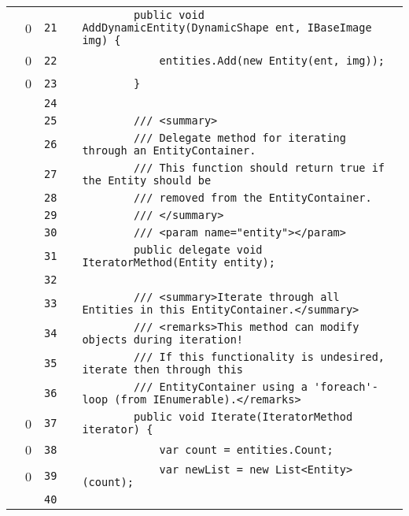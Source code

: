 \documentclass[a4paper,landscape,10pt]{article}
\begin{document}
\begin{longtable}[l]{lrrll}
\cellcolor{red} & 0 & \verb~21~ & & \verb~        public void AddDynamicEntity(DynamicShape ent, IBaseImage img) {~\\
\cellcolor{red} & 0 & \verb~22~ & & \verb~            entities.Add(new Entity(ent, img));~\\
\cellcolor{red} & 0 & \verb~23~ & & \verb~        }~\\
\cellcolor{gray} &  & \verb~24~ & & \verb~~\\
\cellcolor{gray} &  & \verb~25~ & & \verb~        /// <summary>~\\
\cellcolor{gray} &  & \verb~26~ & & \verb~        /// Delegate method for iterating through an EntityContainer.~\\
\cellcolor{gray} &  & \verb~27~ & & \verb~        /// This function should return true if the Entity should be~\\
\cellcolor{gray} &  & \verb~28~ & & \verb~        /// removed from the EntityContainer.~\\
\cellcolor{gray} &  & \verb~29~ & & \verb~        /// </summary>~\\
\cellcolor{gray} &  & \verb~30~ & & \verb~        /// <param name="entity"></param>~\\
\cellcolor{gray} &  & \verb~31~ & & \verb~        public delegate void IteratorMethod(Entity entity);~\\
\cellcolor{gray} &  & \verb~32~ & & \verb~~\\
\cellcolor{gray} &  & \verb~33~ & & \verb~        /// <summary>Iterate through all Entities in this EntityContainer.</summary>~\\
\cellcolor{gray} &  & \verb~34~ & & \verb~        /// <remarks>This method can modify objects during iteration!~\\
\cellcolor{gray} &  & \verb~35~ & & \verb~        /// If this functionality is undesired, iterate then through this~\\
\cellcolor{gray} &  & \verb~36~ & & \verb~        /// EntityContainer using a 'foreach'-loop (from IEnumerable).</remarks>~\\
\cellcolor{red} & 0 & \verb~37~ & & \verb~        public void Iterate(IteratorMethod iterator) {~\\
\cellcolor{red} & 0 & \verb~38~ & & \verb~            var count = entities.Count;~\\
\cellcolor{red} & 0 & \verb~39~ & & \verb~            var newList = new List<Entity>(count);~\\
\cellcolor{gray} &  & \verb~40~ & & \verb~~\\

\end{longtable}
\end{document}
